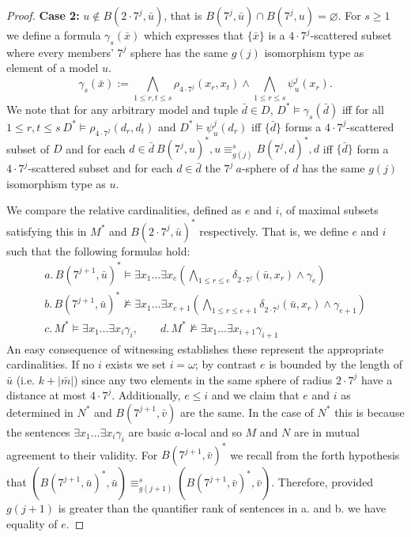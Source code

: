 \documentclass{lmcs} %
\newcommand{\?}{\ensuremath{\mkern0.4\thinmuskip}}
\let\bigland=\bigwedge%
\begin{document}
\begin{proof}
    \noindent
    \textbf{Case 2:}
    $u\not\in B(2\cdot 7^j,\bar{u})$, that is $B(7^j,\bar{u})\cap B(7^j,u)=\varnothing$. For $s\geq 1$ we define a formula $\gamma_s(\bar{x})$ which expresses that $\{\bar{x}\}$ is a $4\cdot 7^j$-scattered subset where every members' $7^j$ sphere has the same $g(j)$ isomorphism type as element of a model $u$.
    \[\gamma_s(\bar{x}):=\bigland_{1\leq r,t\leq s} \rho_{4\cdot7^j}(x_r,x_t)\land\bigland\limits_{1\leq r\leq s}\psi^j_u(x_r).\]
    We note that for any arbitrary model and tuple $\bar{d}\in D$, $D^\ast\models\gamma_s(\bar{d})$ iff for all $1\leq r,t\leq s\ D^\ast\models\rho_{4\cdot 7^j}(d_r,d_t)$ and $D^\ast\models\psi^j_u(d_r)$ iff $\{\bar{d}\}$ forms a $4\cdot 7^j$-scattered subset of $D$ and for each $d\in \bar{d}\ B(7^j,u)^\ast,u\equiv^s_{g(j)} B(7^j,d)^\ast,d$ iff $\{\bar{d}\}$ form a $4\cdot 7^j$-scattered subset and for each $d\in\bar{d}$ the $7^j\ a$-sphere of $d$ has the same $g(j)$ isomorphism type as $u$.

    We compare the relative cardinalities, defined as $e$ and $i$, of maximal subsets satisfying this in $M^\ast$ and $B(2\cdot 7^j,\bar{u})^\ast$ respectively. That is, we define $e$ and $i$ such that the following formulas hold:\begin{gather*}
        a.\, B(7^{j+1},\bar{u})^\ast\models\exists x_1...\exists x_e(\bigland\limits_{1\leq r\leq e} \delta_{2\cdot 7^j}(\bar{u},x_r)\land \gamma_e) \\
        b.\, B(7^{j+1},\bar{u})^\ast\not\models\exists x_1...\exists x_{e+1}(\bigland\limits_{1\leq r\leq e+1}\delta_{2\cdot 7^j}(\bar{u},x_r)\land \gamma_{e+1}) \\
        c.\, M^\ast\models\exists x_1...\exists x_i\gamma_i,\qquad d.\, M^\ast\not\models\exists x_1...\exists x_{i+1}\gamma_{i+1}
    \end{gather*}
    An easy consequence of witnessing establishes these represent the appropriate cardinalities. If no $i$ exists we set $i=\omega$; by contrast $e$ is bounded by the length of $\bar{u}$ (i.e. $k+|\bar{m}|$) since any two elements in the same sphere of radius $2\cdot 7^j$ have a distance at most $4\cdot 7^j$. Additionally, $e\leq i$ and we claim that $e$ and $i$ as determined in $N^\ast$ and $B(7^{j+1},\bar{v})$ are the same. In the case of $N^\ast$ this is because the sentences $\exists x_1...\exists x_i \gamma_i$ are basic $a$-local and so $M$ and $N$ are in mutual agreement to their validity. For $B(7^{j+1},\bar{v})^\ast$ we recall from the forth hypothesis that $(B(7^{j+1},\bar{u})^\ast,\bar{u})\equiv^s_{g(j+1)} (B(7^{j+1},\bar{v})^\ast,\bar{v})$.  Therefore, provided $g(j+1)$ is greater than the quantifier rank of sentences in a. and b. we have equality of $e$.


\end{proof}
\end{document}
